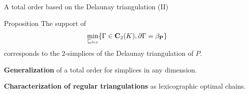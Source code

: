 \begin{frame}{A total order based on the Delaunay triangulation (II)}
	\small
	\begin{minipage}{0.6\linewidth}
		\begin{block}{\small Proposition}
			The support of
			\[
			\min_{\sqsubseteq_{lex}} \{ \Gamma \in \mathbf{C}_2(K), \partial \Gamma = \beta_{\mathbf{P}} \}
			\]
			corresponds to the $2$-simplices of the Delaunay triangulation of $P$.
		\end{block}
	\end{minipage}%
	\begin{minipage}{0.4\linewidth}
	\end{minipage}
	
	\vspace{0.5cm}
	
	\textbf{Generalization} of a total order for simplices in any dimension.
	
	\textbf{Characterization of regular triangulations} as lexicographic optimal chains.
\end{frame}

